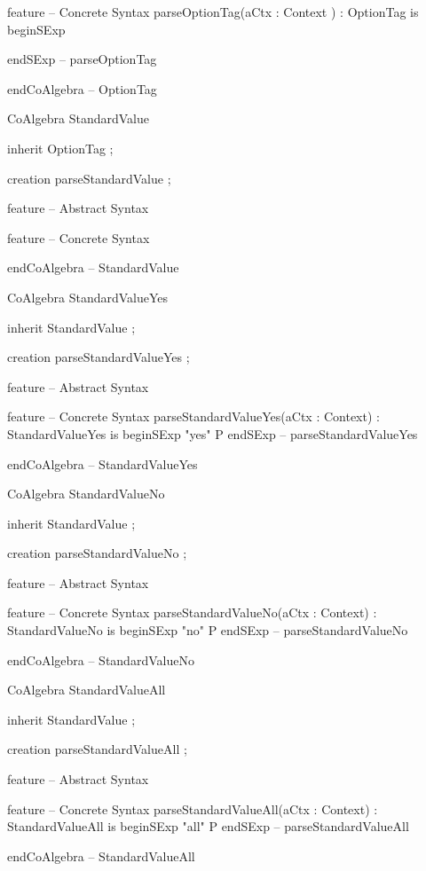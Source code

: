 feature -- Concrete Syntax
  parseOptionTag(aCtx : Context ) : OptionTag is
    beginSExp
      
    endSExp -- parseOptionTag

endCoAlgebra -- OptionTag

CoAlgebra StandardValue

inherit
  OptionTag ;

creation
  parseStandardValue ;
  
feature -- Abstract Syntax

feature -- Concrete Syntax

endCoAlgebra -- StandardValue

CoAlgebra StandardValueYes

inherit
  StandardValue ; 

creation
  parseStandardValueYes ;
  
feature -- Abstract Syntax

feature -- Concrete Syntax
  parseStandardValueYes(aCtx : Context) : StandardValueYes is
    beginSExp
      "yes" P
    endSExp -- parseStandardValueYes
  
endCoAlgebra -- StandardValueYes

CoAlgebra StandardValueNo

inherit
  StandardValue ; 

creation
  parseStandardValueNo ;
  
feature -- Abstract Syntax

feature -- Concrete Syntax
  parseStandardValueNo(aCtx : Context) : StandardValueNo is
    beginSExp
      "no" P
    endSExp -- parseStandardValueNo
  
endCoAlgebra -- StandardValueNo

CoAlgebra StandardValueAll

inherit
  StandardValue ; 

creation
  parseStandardValueAll ;
  
feature -- Abstract Syntax

feature -- Concrete Syntax
  parseStandardValueAll(aCtx : Context) : StandardValueAll is
    beginSExp
      "all" P
    endSExp -- parseStandardValueAll
  
endCoAlgebra -- StandardValueAll



\stopJoylolCode

